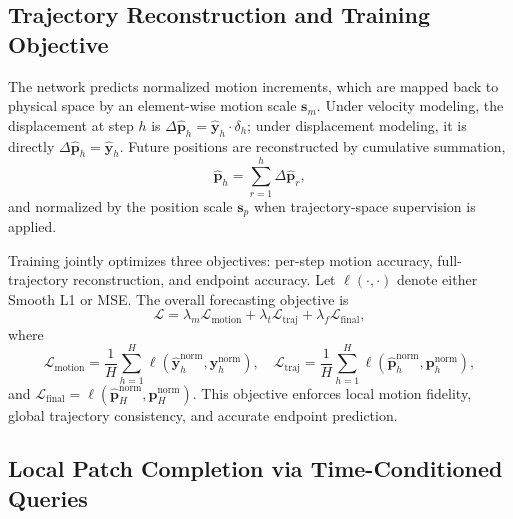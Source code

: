 \subsection{Trajectory Reconstruction and Training Objective}
\label{subsec:objective}

The network predicts normalized motion increments, which are mapped back to physical space by an element-wise motion scale $\bm{s}_m$. Under velocity modeling, the displacement at step $h$ is $\Delta \hat{\bm{p}}_h=\hat{\bm{y}}_h\cdot\delta_h$; under displacement modeling, it is directly $\Delta \hat{\bm{p}}_h=\hat{\bm{y}}_h$. Future positions are reconstructed by cumulative summation,
\begin{equation}
\hat{\bm{p}}_h = \sum_{r=1}^{h}\Delta \hat{\bm{p}}_r,
\end{equation}
and normalized by the position scale $\bm{s}_p$ when trajectory-space supervision is applied.

Training jointly optimizes three objectives: per-step motion accuracy, full-trajectory reconstruction, and endpoint accuracy. Let $\ell(\cdot,\cdot)$ denote either Smooth L1 or MSE. The overall forecasting objective is
\begin{equation}
\mathcal{L}=
\lambda_m \mathcal{L}_{\mathrm{motion}}+
\lambda_t \mathcal{L}_{\mathrm{traj}}+
\lambda_f \mathcal{L}_{\mathrm{final}},
\end{equation}
where
\begin{equation}
\mathcal{L}_{\mathrm{motion}}=\frac{1}{H}\sum_{h=1}^{H}\ell(\hat{\bm{y}}_h^{\mathrm{norm}},\bm{y}_h^{\mathrm{norm}}), \quad
\mathcal{L}_{\mathrm{traj}}=\frac{1}{H}\sum_{h=1}^{H}\ell(\hat{\bm{p}}_h^{\mathrm{norm}},\bm{p}_h^{\mathrm{norm}}),
\end{equation}
and $\mathcal{L}_{\mathrm{final}}=\ell(\hat{\bm{p}}_H^{\mathrm{norm}},\bm{p}_H^{\mathrm{norm}})$. This objective enforces local motion fidelity, global trajectory consistency, and accurate endpoint prediction.

\subsection{Local Patch Completion via Time-Conditioned Queries}
\label{subsec:completion}

